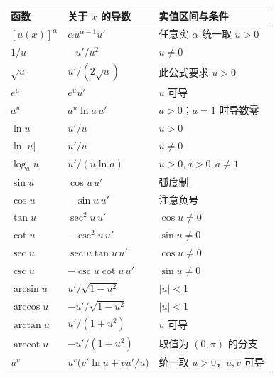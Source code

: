 \begin{longtable}{@{}p{}p{}p{}@{}}
\toprule 函数&关于 $x$ 的导数&实值区间与条件\\\midrule\endhead
$[u(x)]^\alpha$&$\alpha u^{\alpha-1}u'$&任意实 $\alpha$ 统一取 $u>0$\\
$1/u$&$-u'/u^2$&$u\ne0$\\
$\sqrt{u}$&$u'/(2\sqrt{u})$&此公式要求 $u>0$\\
$e^u$&$e^u u'$&$u$ 可导\\
$a^u$&$a^u\ln a\,u'$&$a>0$；$a=1$ 时导数零\\
$\ln u$&$u'/u$&$u>0$\\
$\ln|u|$&$u'/u$&$u\ne0$\\
$\log_a u$&$u'/(u\ln a)$&$u>0,a>0,a\ne1$\\
$\sin u$&$\cos u\,u'$&弧度制\\
$\cos u$&$-\sin u\,u'$&注意负号\\
$\tan u$&$\sec^2u\,u'$&$\cos u\ne0$\\
$\cot u$&$-\csc^2u\,u'$&$\sin u\ne0$\\
$\sec u$&$\sec u\tan u\,u'$&$\cos u\ne0$\\
$\csc u$&$-\csc u\cot u\,u'$&$\sin u\ne0$\\
$\arcsin u$&$u'/\sqrt{1-u^2}$&$|u|<1$\\
$\arccos u$&$-u'/\sqrt{1-u^2}$&$|u|<1$\\
$\arctan u$&$u'/(1+u^2)$&$u$ 可导\\
$\operatorname{arccot}u$&$-u'/(1+u^2)$&取值为 $(0,\pi)$ 的分支\\
$u^v$&$u^v\bigl(v'\ln u+vu'/u\bigr)$&统一取 $u>0$，$u,v$ 可导\\
\bottomrule
\end{longtable}
